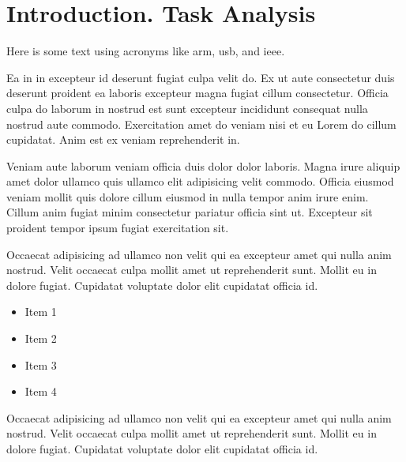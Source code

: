 \documentclass{thesis}
\begin{document}




\printglossary[type=\acronymtype, style=mcolindex]



\section{Introduction. Task Analysis}

Here is some text using acronyms like \acrshort{arm}, \acrlong{usb}, and \acrfull{ieee}.

Ea in in excepteur id deserunt fugiat culpa velit do. Ex ut aute consectetur
duis deserunt proident ea laboris excepteur magna fugiat cillum consectetur.
Officia culpa do laborum in nostrud est sunt excepteur incididunt consequat
nulla nostrud aute commodo. Exercitation amet do veniam nisi et eu Lorem do
cillum cupidatat. Anim est ex veniam reprehenderit in.

Veniam aute laborum veniam officia duis dolor dolor laboris. Magna irure aliquip
amet dolor ullamco quis ullamco elit adipisicing velit commodo. Officia eiusmod
veniam mollit quis dolore cillum eiusmod in nulla tempor anim irure enim. Cillum
anim fugiat minim consectetur pariatur officia sint ut. Excepteur sit proident
tempor ipsum fugiat exercitation sit.

Occaecat adipisicing ad ullamco non velit qui ea excepteur amet qui nulla anim
nostrud. Velit occaecat culpa mollit amet ut reprehenderit sunt. Mollit eu in
dolore fugiat. Cupidatat voluptate dolor elit cupidatat officia id.

\begin{itemize}
    \item Item 1
    \item Item 2
    \item Item 3
    \item Item 4
\end{itemize}

Occaecat adipisicing ad ullamco non velit qui ea excepteur amet qui nulla anim
nostrud. Velit occaecat culpa mollit amet ut reprehenderit sunt. Mollit eu in
dolore fugiat. Cupidatat voluptate dolor elit cupidatat officia id.
\end{document}
